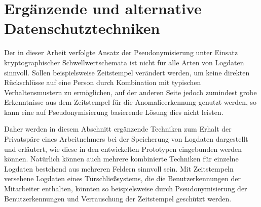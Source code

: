 \chapter{Ergänzende und alternative Datenschutztechniken}

\label{cha_alternatives}


%

%



Der in dieser Arbeit verfolgte Ansatz der Pseudonymisierung unter Einsatz kryptographischer Schwellwertschemata ist nicht für alle Arten von Logdaten sinnvoll. Sollen beispielsweise Zeitstempel verändert werden, um keine direkten Rückschlüsse auf eine Person durch Kombination mit typischen Verhaltensmustern zu ermöglichen, auf der anderen Seite jedoch zumindest grobe Erkenntnisse aus dem Zeitstempel für die Anomalieerkennung genutzt werden, so kann eine auf Pseudonymisierung basierende Lösung dies nicht leisten. 

Daher werden in diesem Abschnitt ergänzende Techniken zum Erhalt der Privatspäre eines Arbeitnehmers bei der Speicherung von Logdaten dargestellt und erläutert, wie diese in den entwickelten Prototypen eingebunden werden können. Natürlich können auch mehrere kombinierte Techniken für einzelne Logdaten bestehend aus mehreren Feldern sinnvoll sein. Mit Zeitstempeln versehene Logdaten eines Türschließsystems, die die Benutzerkennungen der Mitarbeiter enthalten, könnten so beispielsweise durch Pseudonymisierung der Benutzerkennungen und Verrauschung der Zeitstempel geschützt werden.

